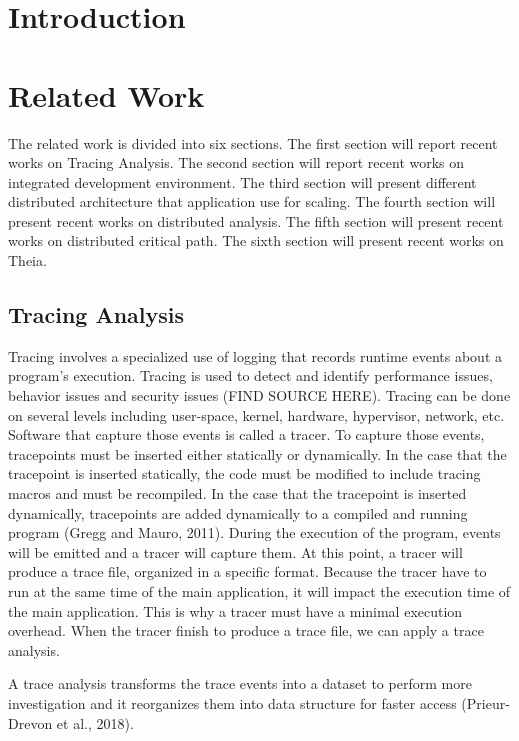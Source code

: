 \label{sec:architecture}

\section{Introduction}

\section{Related Work}

The related work is divided into six sections. The first section will report recent works on Tracing Analysis. The second section will report recent works on integrated development environment. The third section will present different distributed architecture that application use for scaling. The fourth section will present recent works on distributed analysis. The fifth section will present recent works on distributed critical path. The sixth section will present recent works on Theia.


\subsection{Tracing Analysis}

 Tracing involves a specialized use of logging that records runtime events about a program's execution. Tracing is used to detect and identify performance issues, behavior issues and security issues (FIND SOURCE HERE). Tracing can be done on several levels including user-space, kernel, hardware, hypervisor, network, etc. Software that capture those events is called a tracer. To capture those events, tracepoints must be inserted either statically or dynamically. In the case that the tracepoint is inserted statically, the code must be modified to include tracing macros and must be recompiled. In the case that the tracepoint is inserted dynamically, tracepoints are added dynamically to a compiled and running program (Gregg and Mauro, 2011). During the execution of the program, events will be emitted and a tracer will capture them. At this point, a tracer will produce a trace file, organized in a specific format. Because the tracer have to run at the same time of the main application, it will impact the execution time of the main application. This is why a tracer must have a minimal execution overhead. When the tracer finish to produce a trace file, we can apply a trace analysis.

 A trace analysis transforms the trace events into a dataset to perform more investigation and it reorganizes them into data structure for faster access (Prieur-Drevon et al., 2018).

